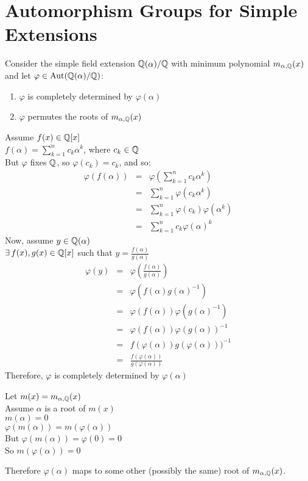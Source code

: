 \documentclass[letterpaper,12pt,fleqn]{article}
\renewcommand{\a}{\alpha}
\newcommand{\vp}{\varphi}
\DeclareMathOperator{\Aut}{Aut}
\begin{document}
\section*{Automorphism Groups for Simple Extensions}

\begin{theorem}
Consider the simple field extension $\Q(\a)/\Q$ with minimum polynomial
$m_{\a,\Q}(x)$ and let $\vp\in\Aut(\Q(\a)/\Q)$:
\begin{enumerate}
\item $\vp$ is completely determined by $\vp(\a)$
\item $\vp$ permutes the roots of $m_{\a,\Q}(x)$
\end{enumerate}
\end{theorem}

\begin{theproof}
  Assume $f(x)\in \mathbb{Q}[x]$ \\
  $f(\a)=\sum_{k=1}^nc_k\a^k$, where $c_k\in\mathbb{Q}$ \\
  But $\vp$ fixes $\mathbb{Q}$, so $\vp(c_k)=c_k$, and so:
  \begin{eqnarray*}
    \vp(f(\a)) &=& \vp\left(\sum_{k=1}^nc_k\a^k\right) \\
    &=& \sum_{k=1}^n\vp(c_k\a^k) \\
    &=& \sum_{k=1}^n\vp(c_k)\vp(\a^k) \\
    &=& \sum_{k=1}^nc_k\vp(\a)^k
  \end{eqnarray*}
  Now, assume $y\in\Q(\a)$ \\
  $\exists\,f(x),g(x)\in \mathbb{Q}[x]$ such that $y=\frac{f(\a)}{g(\a)}$
  \begin{eqnarray*}
    \vp(y) &=& \vp\left(\frac{f(\a)}{g(\a)}\right) \\
    &=& \vp\left(f(\a)g(\a)^{-1}\right) \\
    &=& \vp(f(\a))\vp(g(\a)^{-1}) \\
    &=& \vp(f(\a))\vp(g(\a))^{-1} \\
    &=& f(\vp(\a))g(\vp(\a)))^{-1} \\
    &=& \frac{f(\vp(\a))}{g(\vp(\a))}
  \end{eqnarray*}
  Therefore, $\vp$ is completely determined by $\vp(\a)$

  Let $m(x)=m_{\a,\Q}(x)$ \\
  Assume $\a$ is a root of $m(x)$ \\
  $m(\a)=0$ \\
  $\vp(m(\a))=m(\vp(\a))$ \\
  But $\vp(m(\a))=\vp(0)=0$ \\
  So $m(\vp(\a))=0$

  Therefore $\vp(\a)$ maps to some other (possibly the same) root of
  $m_{\a,\Q}(x)$.
\end{theproof}
\end{document}
